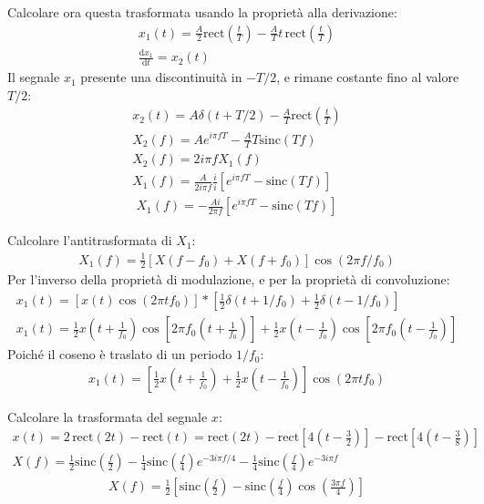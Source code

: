 \documentclass{article}
\newcommand{\rect}{\mbox{rect}}
\newcommand{\sinc}{\mbox{sinc}}
\newcommand{\df}{\mathrm{d}}
\begin{document}
Calcolare ora questa trasformata usando la proprietà alla derivazione:
\begin{gather*}
    x_1(t)=\displaystyle\frac{A}{2}\rect\left(\frac{t}{T}\right)-\frac{A}{T}t\,\rect\left(\frac{t}{T}\right)\\
    \displaystyle\frac{\df x_1}{\df t}=x_2(t)
\end{gather*}
Il segnale $x_1$ presente una discontinuità in $-T/2$, e rimane costante fino al valore $T/2$:
\begin{gather*}
    x_2(t)=A\delta(t+T/2)-\displaystyle\frac{A}{T}\rect\left(\frac{t}{T}\right)\\
    X_2(f)=Ae^{i\pi fT}-\displaystyle\frac{A}{T}T\sinc(Tf)\\
    X_2(f)=2i\pi fX_1(f)\\
    X_1(f)=\displaystyle\frac{A}{2i\pi f}\frac{i}{i}\left[e^{i\pi fT}-\sinc(Tf)\right]
\end{gather*}
\begin{gather}
    X_1(f)=\displaystyle-\frac{Ai}{2\pi f}\left[e^{i\pi fT}-\sinc(Tf)\right]
\end{gather}


Calcolare l'antitrasformata di $X_1$:
\begin{gather*}
    X_1(f)=\displaystyle\frac{1}{2}\left[X(f-f_0)+X(f+f_0)\right]\cos(2\pi f/f_0)
\end{gather*}
Per l'inverso della proprietà di modulazione, e per la proprietà di convoluzione:
\begin{gather*}
    x_1(t)=\left[x(t)\cos(2\pi tf_0)\right]*\left[\displaystyle\frac{1}{2}\delta(t+1/f_0)+\frac{1}{2}\delta(t-1/f_0)\right]\\
    x_1(t)=\displaystyle\frac{1}{2}x\left(t+\frac{1}{f_0}\right)\cos\left[2\pi f_0\left(t+\frac{1}{f_0}\right)\right]+\frac{1}{2}x\left(t-\frac{1}{f_0}\right)\cos\left[2\pi f_0\left(t-\frac{1}{f_0}\right)\right]
\end{gather*}
Poiché il coseno è traslato di un periodo $1/f_0$: 
\begin{gather}
    x_1(t)=\left[\displaystyle\frac{1}{2}x\left(t+\frac{1}{f_0}\right)+\frac{1}{2}x\left(t-\frac{1}{f_0}\right)\right]\cos(2\pi tf_0)
\end{gather}


Calcolare la trasformata del segnale $x$:
\begin{gather*}
    x(t)=2\,\rect(2t)-\rect(t)=\rect(2t)-\rect\left[\displaystyle4\left(t-\frac{3}{2}\right)\right]-\rect\left[\displaystyle4\left(t-\frac{3}{8}\right)\right]\\
    X(f)=\displaystyle\frac{1}{2}\sinc\left(\frac{f}{2}\right)-\frac{1}{4}\sinc\left(\frac{f}{4}\right)e^{-3i\pi f/4}-\frac{1}{4}\sinc\left(\frac{f}{4}\right)e^{-3i\pi f}
\end{gather*}
\begin{gather}
    X(f)=\displaystyle\frac{1}{2}\left[\sinc\left(\frac{f}{2}\right)-\sinc\left(\frac{f}{4}\right)\cos\left(\frac{3\pi f}{4}\right)\right]
\end{gather}
\end{document}
